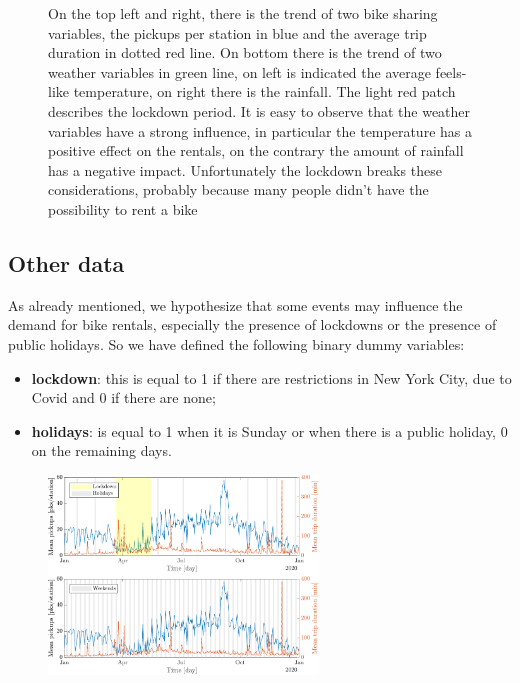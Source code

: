\begin{figure}[h!]
	\quad
	\caption{On the top left and right, there is the trend of two bike sharing variables, the pickups per station in blue and the average trip duration in dotted red line. On bottom there is the trend of two weather variables in green line, on left is indicated the average feels-like temperature, on right there is the rainfall. The light red patch describes the lockdown period. It is easy to observe that the weather variables have a strong influence, in particular the temperature has a positive effect on the rentals, on the contrary the amount of rainfall has a negative impact. Unfortunately the lockdown breaks these considerations, probably because many people didn't have the possibility to rent a bike}
\end{figure}

\subsection{Other data}
As already mentioned, we hypothesize that some events may influence the demand for bike rentals, especially the presence of lockdowns or the presence of public holidays. So we have defined the following binary dummy variables:
\begin{itemize}
	\item \textbf{lockdown}: this is equal to \num{1} if there are restrictions in New York City, due to Covid and \num{0} if there are none;
	\item \textbf{holidays}: is equal to \num{1} when it is Sunday or when there is a public holiday, \num{0} on the remaining days.
\end{itemize}

\begin{figure}[h!]
	\centering
	\includegraphics[height = 200px]{Images/Dataset description/Chosen/Trend}
\end{figure}